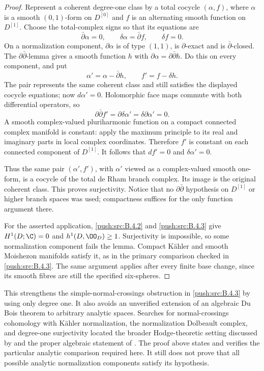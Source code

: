 \begin{proof}
Represent a coherent degree-one class by a total cocycle
$(\alpha,f)$, where $\alpha$ is a smooth $(0,1)$-form on
$D^{[0]}$ and $f$ is an alternating smooth function on
$D^{[1]}$. Choose the total-complex signs so that its equations
are
\[
 \bar\partial\alpha=0,\qquad
 \delta\alpha=\bar\partial f,\qquad \delta f=0.
\]
On a normalization component, $\partial\alpha$ is of type
$(1,1)$, is $\partial$-exact and is $\bar\partial$-closed.
The $\partial\bar\partial$-lemma gives a smooth function $h$
with $\partial\alpha=\partial\bar\partial h$.
Do this on every component, and put
\[
 \alpha'=\alpha-\bar\partial h,\qquad
 f'=f-\delta h.
\]
The pair represents the same coherent class and still satisfies
the displayed cocycle equations; now $d\alpha'=0$.
Holomorphic face maps commute with both differential operators,
so
\[
 \partial\bar\partial f'
       =\partial\delta\alpha'=\delta\partial\alpha'=0.
\]
A smooth complex-valued pluriharmonic function on a compact
connected complex manifold is constant: apply the maximum
principle to its real and imaginary parts in local complex
coordinates. Therefore $f'$ is constant on each connected
component of $D^{[1]}$. It follows that
$df'=0$ and $\delta\alpha'=0$.

Thus the same pair $(\alpha',f')$, with $\alpha'$ viewed as
a complex-valued smooth one-form, is a cocycle of the total
de Rham branch complex. Its image is the original coherent
class. This proves surjectivity. Notice that no
$\partial\bar\partial$ hypothesis on $D^{[1]}$ or higher
branch spaces was used; compactness suffices for the only
function argument there.

For the asserted application, \ref{push:src:B.4.2} and \ref{push:src:B.4.3} give
$H^1(D;\C)=0$ and $h^1(D,\OO_D)\geq1$.
Surjectivity is impossible, so some normalization component
fails the lemma. Compact K\"ahler and smooth Moishezon
manifolds satisfy it, as in the primary comparison checked
in \ref{push:src:B.4.3}. The same argument applies after every finite base
change, since its smooth fibres are still the specified
six-spheres.
\end{proof}

This strengthens the simple-normal-crossings obstruction in
\ref{push:src:B.4.3} by using only degree one. It also avoids an unverified
extension of an algebraic Du Bois theorem to arbitrary analytic
spaces. Searches for normal-crossings cohomology with K\"ahler
normalization, the normalization Dolbeault complex, and
degree-one surjectivity located the broader Hodge-theoretic
setting discussed by \citet{Chen2026HodgeRoot} and the proper
algebraic statement of \citet{GrafKovacs2014Root}. The proof above
states and verifies the particular analytic comparison required
here. It still does not prove that all possible analytic
normalization components satisfy its hypothesis.

